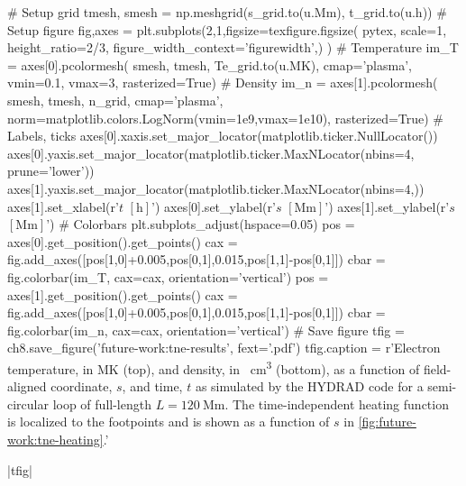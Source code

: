 \begin{pycode}[chapter8]
# Setup grid
tmesh, smesh = np.meshgrid(s_grid.to(u.Mm), t_grid.to(u.h))
# Setup figure
fig,axes = plt.subplots(2,1,figsize=texfigure.figsize(
    pytex,
    scale=1,
    height_ratio=2/3,
    figure_width_context='figurewidth',)
)
# Temperature
im_T = axes[0].pcolormesh(
    smesh, tmesh, Te_grid.to(u.MK),
    cmap='plasma',
    vmin=0.1,
    vmax=3,
    rasterized=True)
# Density
im_n = axes[1].pcolormesh(
    smesh, tmesh, n_grid,
    cmap='plasma',
    norm=matplotlib.colors.LogNorm(vmin=1e9,vmax=1e10),
    rasterized=True)
# Labels, ticks
axes[0].xaxis.set_major_locator(matplotlib.ticker.NullLocator())
axes[0].yaxis.set_major_locator(matplotlib.ticker.MaxNLocator(nbins=4, prune='lower'))
axes[1].yaxis.set_major_locator(matplotlib.ticker.MaxNLocator(nbins=4,))
axes[1].set_xlabel(r'$t$ $[\si{\hour}]$')
axes[0].set_ylabel(r'$s$ $[\si{\mega\m}]$')
axes[1].set_ylabel(r'$s$ $[\si{\mega\m}]$')
# Colorbars
plt.subplots_adjust(hspace=0.05)
pos = axes[0].get_position().get_points()
cax = fig.add_axes([pos[1,0]+0.005,pos[0,1],0.015,pos[1,1]-pos[0,1]])
cbar = fig.colorbar(im_T, cax=cax, orientation='vertical')
pos = axes[1].get_position().get_points()
cax = fig.add_axes([pos[1,0]+0.005,pos[0,1],0.015,pos[1,1]-pos[0,1]])
cbar = fig.colorbar(im_n, cax=cax, orientation='vertical')
# Save figure
tfig = ch8.save_figure('future-work:tne-results', fext='.pdf')
tfig.caption = r'Electron temperature, in \si{\mega\kelvin} (top), and density, in \si{\per\cubic\cm} (bottom), as a function of field-aligned coordinate, $s$, and time, $t$ as simulated by the HYDRAD code for a semi-circular loop of full-length $L=\SI{120}{\mega\m}$. The time-independent heating function is localized to the footpoints and is shown as a function of $s$ in \autoref{fig:future-work:tne-heating}.'
\end{pycode}
\py[chapter8]|tfig|
